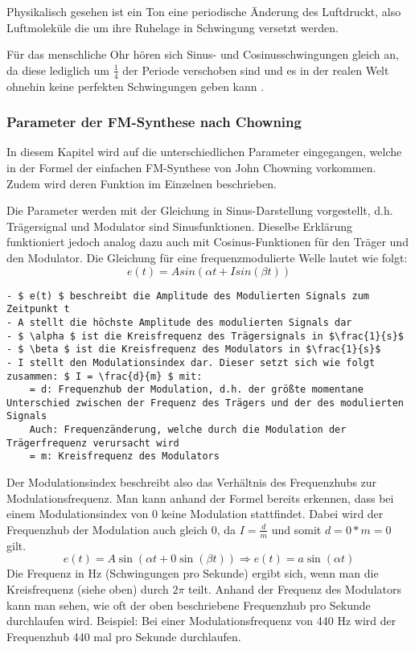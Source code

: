 Physikalisch gesehen ist ein Ton eine periodische Änderung des Luftdruckt, also Luftmoleküle die um ihre Ruhelage in Schwingung versetzt werden\cite[s. 111 f.]{zwicker}. 

Für das menschliche Ohr hören sich Sinus- und Cosinusschwingungen gleich an, da diese lediglich um $\frac{1}{4}$ der Periode verschoben sind und es in der realen Welt ohnehin keine perfekten Schwingungen geben kann \cite[s. 3f.]{zwicker}. 

\FloatBarrier
\subsubsection{Parameter der FM-Synthese nach Chowning}
\label{chowningparameter}

In diesem Kapitel wird auf die unterschiedlichen Parameter eingegangen, welche in der Formel der einfachen FM-Synthese von John Chowning vorkommen. Zudem wird deren Funktion im Einzelnen beschrieben.

Die Parameter werden mit der Gleichung in Sinus-Darstellung vorgestellt, d.h. Trägersignal und Modulator sind Sinusfunktionen. Dieselbe Erklärung funktioniert jedoch analog dazu auch mit Cosinus-Funktionen für den Träger und den Modulator.
Die Gleichung für eine frequenzmodulierte Welle lautet wie folgt:
\[ e(t) = A sin(\alpha t + I sin(\beta t)) \]

\begin{lstlisting}[mathescape]
- $ e(t) $ beschreibt die Amplitude des Modulierten Signals zum Zeitpunkt t
- A stellt die höchste Amplitude des modulierten Signals dar
- $ \alpha $ ist die Kreisfrequenz des Trägersignals in $\frac{1}{s}$
- $ \beta $ ist die Kreisfrequenz des Modulators in $\frac{1}{s}$
- I stellt den Modulationsindex dar. Dieser setzt sich wie folgt zusammen: $ I = \frac{d}{m} $ mit:
	= d: Frequenzhub der Modulation, d.h. der größte momentane Unterschied zwischen der Frequenz des Trägers und der des modulierten Signals
	Auch: Frequenzänderung, welche durch die Modulation der Trägerfrequenz verursacht wird
	= m: Kreisfrequenz des Modulators
\end{lstlisting} \cite{chowningPaper}

Der Modulationsindex beschreibt also das Verhältnis des Frequenzhubs zur Modulationsfrequenz.
Man kann anhand der Formel bereits erkennen, dass bei einem Modulationsindex von 0 keine Modulation stattfindet. Dabei wird der Frequenzhub der Modulation auch gleich 0, da $ I=\frac{d}{m} $ und somit $ d = 0*m = 0 $ gilt. 
\[ e(t) = A \sin(\alpha t + 0 \sin(\beta t))  \Rightarrow  e(t) = a \sin(\alpha t) \]
Die Frequenz in Hz (Schwingungen pro Sekunde) ergibt sich, wenn man die Kreisfrequenz (siehe oben) durch $2\pi$ teilt.
Anhand der Frequenz des Modulators kann man sehen, wie oft der oben beschriebene Frequenzhub pro Sekunde durchlaufen wird. Beispiel: Bei einer Modulationsfrequenz von 440 Hz wird der Frequenzhub 440 mal pro Sekunde durchlaufen.
